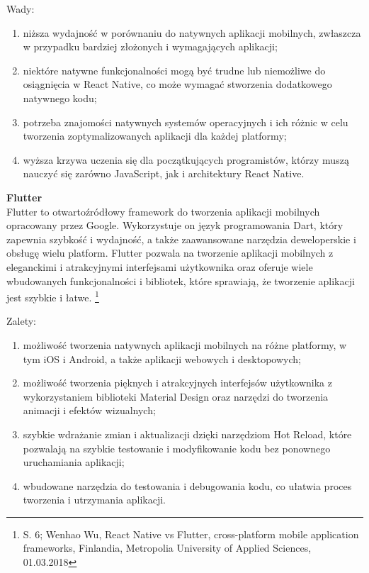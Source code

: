 \documentclass[12pt, a4paper, twoside, openany]{book}
\begin{document}
Wady:
\begin{enumerate}[label=--]
    \item niższa wydajność w porównaniu do natywnych aplikacji mobilnych, zwłaszcza w przypadku bardziej złożonych i wymagających aplikacji;
    \item niektóre natywne funkcjonalności mogą być trudne lub niemożliwe do osiągnięcia w React Native, co może wymagać stworzenia dodatkowego natywnego kodu;
    \item potrzeba znajomości natywnych systemów operacyjnych i ich różnic w celu tworzenia zoptymalizowanych aplikacji dla każdej platformy;
    \item wyższa krzywa uczenia się dla początkujących programistów, którzy muszą nauczyć się zarówno JavaScript, jak i architektury React Native.
\end{enumerate}

\textbf{Flutter\\}
\indent Flutter to otwartoźródłowy framework do tworzenia aplikacji mobilnych opracowany przez Google. Wykorzystuje on język programowania Dart, który zapewnia szybkość i wydajność, a także zaawansowane narzędzia deweloperskie i obsługę wielu platform. Flutter pozwala na tworzenie aplikacji mobilnych z eleganckimi i atrakcyjnymi interfejsami użytkownika oraz oferuje wiele wbudowanych funkcjonalności i bibliotek, które sprawiają, że tworzenie aplikacji jest szybkie i łatwe. \footnote{S. 6; Wenhao Wu, React Native vs Flutter, cross-platform mobile application frameworks, Finlandia, Metropolia University of Applied Sciences, 01.03.2018}
    
Zalety:
\begin{enumerate}[label=--]
    \item możliwość tworzenia natywnych aplikacji mobilnych na różne platformy, w tym iOS i Android, a także aplikacji webowych i desktopowych;
    \item możliwość tworzenia pięknych i atrakcyjnych interfejsów użytkownika z wykorzystaniem biblioteki Material Design oraz narzędzi do tworzenia animacji i efektów wizualnych;
    \item szybkie wdrażanie zmian i aktualizacji dzięki narzędziom Hot Reload, które pozwalają na szybkie testowanie i modyfikowanie kodu bez ponownego uruchamiania aplikacji;
    \item wbudowane narzędzia do testowania i debugowania kodu, co ułatwia proces tworzenia i utrzymania aplikacji.
\end{enumerate}
\end{document}

